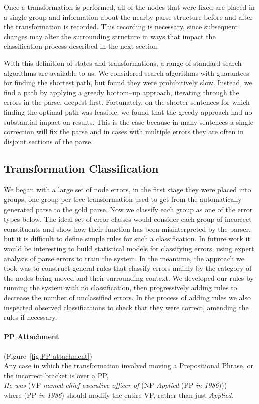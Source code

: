Once a transformation is performed, all of the nodes that were fixed are placed in a single group and information about the nearby parse structure before and after the transformation is recorded.
This recording is necessary, since subsequent changes may alter the surrounding structure in ways that impact the classification process described in the next section.

With this definition of states and transformations, a range of standard search algorithms are available to us.
We considered search algorithms with guarantees for finding the shortest path, but found they were prohibitively slow.
Instead, we find a path by applying a greedy bottom--up approach, iterating through the errors in the parse, deepest first.
Fortunately, on the shorter sentences for which finding the optimal path was feasible, we found that the greedy approach had no substantial impact on results.
This is the case because in many sentences a single correction will fix the parse and in cases with multiple errors they are often in disjoint sections of the parse.

\subsection{Transformation Classification} \label{sec:classify}

We began with a large set of node errors, in the first stage they were placed into groups, one group per tree transformation used to get from the automatically generated parse to the gold parse.
Now we classify each group as one of the error types below.
The ideal set of error classes would consider each group of incorrect constituents and show how their function has been misinterpreted by the parser, but it is difficult to define simple rules for such a classification.
In future work it would be interesting to build statistical models for classifying errors, using expert analysis of parse errors to train the system.
In the meantime, the approach we took was to construct general rules that classify errors mainly by the category of the nodes being moved and their surrounding context.
We developed our rules by running the system with no classification, then progressively adding rules to decrease the number of unclassified errors.
In the process of adding rules we also inspected observed classifications to check that they were correct, amending the rules if necessary.

\paragraph{PP Attachment} (Figure~\ref{fig:PP-attachment}) \\
Any case in which the transformation involved moving a Prepositional Phrase, or the incorrect bracket is over a PP, \myeg \\ 
\emph{He was} (VP \emph{named chief executive officer of} (NP \emph{Applied} (PP \emph{in 1986}))) \\
where (PP \emph{in 1986}) should modify the entire VP, rather than just \emph{Applied}.

